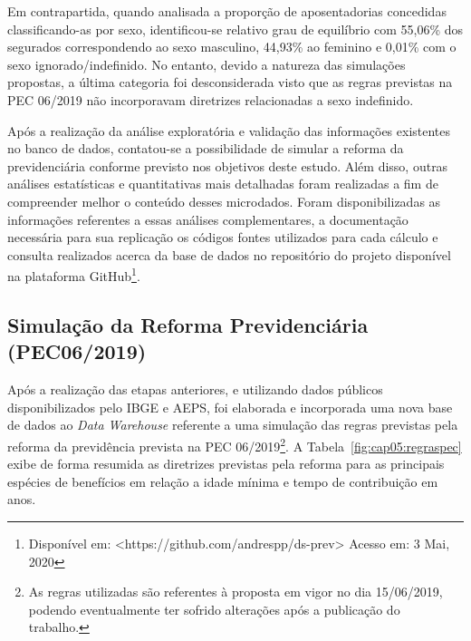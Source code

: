 Em contrapartida, quando analisada a proporção de aposentadorias concedidas classificando-as por sexo, identificou-se relativo grau de equilíbrio com 55,06\% dos segurados correspondendo ao sexo masculino, 44,93\% ao feminino e 0,01\% com o sexo ignorado/indefinido. No entanto, devido a natureza das simulações propostas, a última categoria foi desconsiderada visto que as regras previstas na PEC 06/2019 não incorporavam diretrizes relacionadas a sexo indefinido. 

Após a realização da análise exploratória e validação das informações existentes no banco de dados, contatou-se a possibilidade de simular a reforma da previdenciária conforme previsto nos objetivos deste estudo. Além disso, outras análises estatísticas e quantitativas mais detalhadas foram realizadas a fim de compreender melhor o conteúdo desses microdados. Foram disponibilizadas as informações referentes a essas análises complementares, a documentação necessária para sua replicação os códigos fontes utilizados para cada cálculo e consulta realizados acerca da base de dados no repositório do projeto disponível na plataforma GitHub\footnote{Disponível em: <https://github.com/andrespp/ds-prev> Acesso em: 3 Mai, 2020}.

\subsection{Simulação da Reforma Previdenciária (PEC06/2019)}

Após a realização das etapas anteriores, e utilizando dados públicos disponibilizados pelo IBGE e AEPS, foi elaborada e incorporada uma nova base de dados ao \textit{Data Warehouse} referente a uma simulação das regras previstas pela reforma da previdência prevista na PEC 06/2019\footnote{As regras utilizadas são referentes à proposta em vigor no dia 15/06/2019, podendo eventualmente ter sofrido alterações após a publicação do trabalho.}. A Tabela~\ref{fig:cap05:regraspec} exibe de forma resumida as diretrizes previstas pela reforma para as principais espécies de benefícios em relação a idade mínima e tempo de contribuição em anos. 

